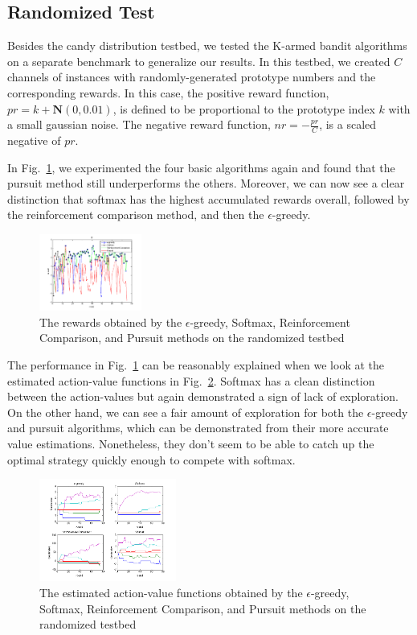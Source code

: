 \documentclass[conference]{IEEEtran}
\begin{document}
\subsection{Randomized Test}
Besides the candy distribution testbed, we tested the K-armed bandit algorithms on a separate benchmark to generalize our results. In this testbed, we created $C$ channels of instances with randomly-generated prototype numbers and the corresponding rewards. In this case, the positive reward function, $pr = k + \mathbf{N}(0,0.01)$, is defined to be proportional to the prototype index $k$ with a small gaussian noise. The negative reward function, $nr = - \frac{pr}{C}$, is a scaled negative of $pr$.

In Fig.~\ref{sutton_random_r}, we experimented the four basic algorithms again and found that the pursuit method still underperforms the others. Moreover, we can now see a clear distinction that softmax has the highest accumulated rewards overall, followed by the reinforcement comparison method, and then the $\epsilon$-greedy. 

\begin{figure}
	\center	
	\includegraphics[width=0.3\textwidth]{fig/sutton_random_r.png}
	\caption{The rewards obtained by the $\epsilon$-greedy, Softmax, Reinforcement Comparison, and Pursuit methods on the randomized testbed}
	\label{sutton_random_r}
\end{figure}

The performance in Fig.~\ref{sutton_random_r} can be reasonably explained when we look at the estimated action-value functions in Fig.~\ref{sutton_random_qr}. Softmax has a clean distinction between the action-values but again demonstrated a sign of lack of exploration. On the other hand, we can see a fair amount of exploration for both the $\epsilon$-greedy and pursuit algorithms, which can be demonstrated from their more accurate value estimations. Nonetheless, they don't seem to be able to catch up the optimal strategy quickly enough to compete with softmax.


\begin{figure}
	\center	
	\includegraphics[width=0.4\textwidth]{fig/sutton_random_qr.png}
	\caption{The estimated action-value functions obtained by the $\epsilon$-greedy, Softmax, Reinforcement Comparison, and Pursuit methods on the randomized testbed}
	\label{sutton_candy_qr}
	\label{sutton_random_qr}
\end{figure}
\end{document}
